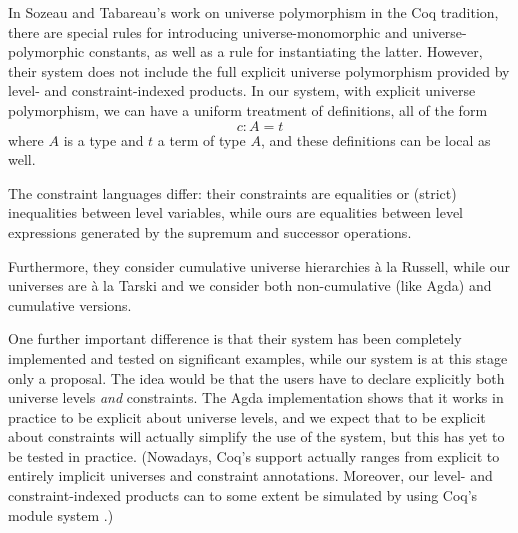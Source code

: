 \documentclass[11pt,a4paper]{article}
\theoremstyle{definition}
\newcommand{\UU}{\mathsf{U}}
\newcommand{\Type}{\mathsf{Type}}
\begin{document}
In Sozeau and Tabareau's \cite{SozeauTabareau:coq} work on universe polymorphism in the Coq tradition, there are special rules for introducing universe-monomorphic and universe-polymorphic constants, as well as a rule for instantiating the latter.
However, their system does not include the full explicit universe polymorphism provided by level- and constraint-indexed products.
In our system, with explicit universe polymorphism, we can have a uniform treatment of definitions, all of the form
$$ c : A = t$$
where $A$ is a type and $t$ a term of type $A$, and these definitions can be local as well.

The constraint languages differ: their constraints are equalities or (strict) inequalities between level variables, while ours are equalities between level expressions generated by the supremum and successor operations.

Furthermore, they consider cumulative universe hierarchies  \`a la Russell, while
our universes are \`a la Tarski and we consider both non-cumulative (like Agda) and cumulative versions.

%
One further important difference is that their system has been completely implemented and tested on
significant examples, while our system is at this stage only a proposal. The idea would be that the
users have to declare explicitly both universe levels {\em and} constraints. The Agda implementation
shows that it works in practice to be explicit about universe levels, and we expect that to be
explicit about constraints will actually simplify the use of the system, but this has yet to be tested in
practice. (Nowadays, Coq’s support actually ranges from explicit to entirely implicit universes and constraint annotations. Moreover, our level- and constraint-indexed products can to some extent be simulated by using Coq's module system
\cite{coq:univpoly}.)
\end{document}
